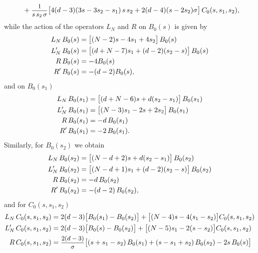 \documentclass[a4paper,11pt,openright,twoside]{book}
\let\s=\sigma  \let\t=\tau     \let\u=\upsilon \let\f=\phi
\newcommand{\sdfrac}[2]{\mbox{\small$\displaystyle\frac{#1}{#2}$}}
\numberwithin{equation}{section}
\begin{document}
{{\begin{subequations}
\begin{align}
		&\hspace{0.5cm}+\sdfrac{1}{s\,s_2\,\s}\big[4( d-3)(3s-3s_2-s_1)\,s\,s_2+2( d-4)(s-2s_2)\s\big]\,C_0(s,s_1,s_2),
	\end{align}
\end{subequations}
while the action of the operators $L_N$ and $R$ on $B_0(s)$ is given by
\begin{subequations}
	\begin{align}
		L_N\,B_0(s)&=\big[(N-2)s-4s_1+4s_2\big]\,B_0(s)\notag\\
		L'_N\,B_0(s)&=\big[(d+N-7)s_1+(d-2)(s_2-s)\big]\,B_0(s)\notag\\
		R\,B_0(s)&=-4B_0(s)\notag\\
		R'\,B_0(s)&=-(d-2)B_0(s),
	\end{align}
\end{subequations}
and on $B_0(s_1)$ 
\begin{subequations}
	\begin{align}
		L_N\,B_0(s_1)&=\big[(d+N-6)s+d(s_2-s_1)\big]\,B_0(s_1)\notag\\
		L'_N\,B_0(s_1)&=\big[(N-3)s_1-2s+2s_2\big]\,B_0(s_1)\notag\\
		R\,B_0(s_1)&=-d\,B_0(s_1)\notag\\
		R'\,B_0(s_1)&=-2\,B_0(s_1).
	\end{align}
\end{subequations}
Similarly, for $B_0(s_2)$ we obtain
\begin{subequations}
	\begin{align}
		L_N\,B_0(s_2)&=\big[(N-d+2)s+d(s_2-s_1)\big]\,B_0(s_2)\notag\\
		L'_N\,B_0(s_2)&=\big[(N-d+1)s_1+(d-2)(s_2-s)\big]\,B_0(s_2)\notag\\
		R\,B_0(s_2)&=-d\,B_0(s_2)\notag\\
		R'\,B_0(s_2)&=-(d-2)\,B_0(s_2),
	\end{align}
\end{subequations}
and for $C_0(s,s_1,s_2)$
\begin{subequations}
	\begin{align}
		L_N\,C_0(s,s_1,s_2)&=2(d-3)\big[B_0(s_1)-B_0(s_2)\big]+\big[(N-4)s-4(s_1-s_2)\big]C_0(s,s_1,s_2)\notag\\
		L'_N\,C_0(s,s_1,s_2)&=2(d-3)\big[B_0(s)-B_0(s_2)\big]+\big[(N-5)s_1-2(s-s_2)\big]C_0(s,s_1,s_2)\notag\\
		R\,C_0(s,s_1,s_2)&=\sdfrac{2(d-3)}{\s}\big[(s+s_1-s_2)\,B_0(s_1)+(s-s_1+s_2)\,B_0(s_2)-2s\,B_0(s)\big]\notag\notag\\

\end{align}
\end{subequations}}}
\end{document}
